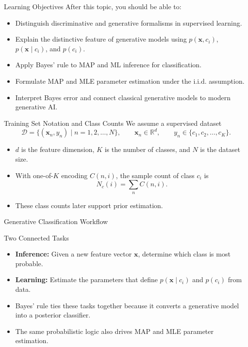\documentclass[10pt]{beamer}
\begin{document}
\begin{frame}{Learning Objectives}
  \justifying
  After this topic, you should be able to:
  \begin{itemize}
    \item Distinguish discriminative and generative formalisms in supervised learning.
    \item Explain the distinctive feature of generative models using $p(\bm{x},c_i)$, $p(\bm{x}\mid c_i)$, and $p(c_i)$.
    \item Apply Bayes' rule to MAP and ML inference for classification.
    \item Formulate MAP and MLE parameter estimation under the i.i.d. assumption.
    \item Interpret Bayes error and connect classical generative models to modern generative AI.
  \end{itemize}
\end{frame}

\begin{frame}{Training Set Notation and Class Counts}
  \justifying
  We assume a supervised dataset
  \[
    \mathcal{D} = \{(\bm{x}_n,y_n) \mid n=1,2,\ldots,N\},
    \qquad
    \bm{x}_n \in \mathbb{R}^d,
    \qquad
    y_n \in \{c_1,c_2,\ldots,c_K\}.
  \]
  \begin{itemize}
    \item $d$ is the feature dimension, $K$ is the number of classes, and $N$ is the dataset size.
    \item With one-of-$K$ encoding $C(n,i)$, the sample count of class $c_i$ is
    \[
      N_c(i) = \sum_n C(n,i).
    \]
    \item These class counts later support prior estimation.
  \end{itemize}
\end{frame}

\begin{frame}{Generative Classification Workflow}
  \justifying
  \begin{conceptbox}{Two Connected Tasks}
    \begin{itemize}
      \item \textbf{Inference:} Given a new feature vector $\bm{x}$, determine which class is most probable.
      \item \textbf{Learning:} Estimate the parameters that define $p(\bm{x}\mid c_i)$ and $p(c_i)$ from data.
    \end{itemize}
  \end{conceptbox}
  \vspace{0.4em}
  \begin{itemize}
    \item Bayes' rule ties these tasks together because it converts a generative model into a posterior classifier.
    \item The same probabilistic logic also drives MAP and MLE parameter estimation.
  \end{itemize}
\end{frame}
\end{document}
